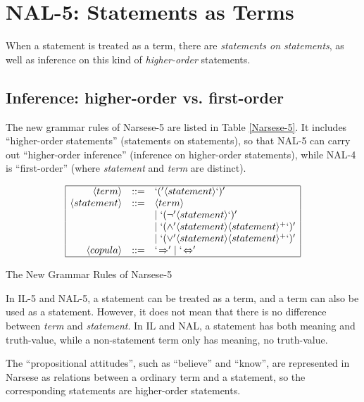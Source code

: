 
\chapter{NAL-5: Statements as Terms}

When a statement is treated as a term, there are \emph{statements on statements}, as well as inference on this kind of \emph{higher-order} statements. 

\section{Inference: higher-order vs. first-order}

The new grammar rules of Narsese-5 are listed in Table \ref{Narsese-5}. It includes ``higher-order statements'' (statements on statements), so that NAL-5 can carry out ``higher-order inference'' (inference on higher-order statements), while NAL-4 is ``first-order'' (where \emph{statement} and \emph{term} are distinct).

\begin{table}[htb]
\[\begin{array}{|rrl|}
\hline
\langle term \rangle & ::= & `(' \langle statement \rangle `)' \\
\langle statement \rangle & ::= & \langle term \rangle \\ &&
                  		 | \; `(\neg' \langle statement \rangle `)'\\ &&
                  		 | \; `(\wedge' \langle statement \rangle \langle statement \rangle^+ `)' \\ &&
                  		 | \; `(\vee' \langle statement \rangle \langle statement \rangle^+ `)' \\
\langle copula \rangle & ::= & `\!\Rightarrow' | \; `\!\Leftrightarrow' \\
\hline
\end{array} \]
\caption{The New Grammar Rules of Narsese-5}
\label{Narsese-5}
\end{table}

In IL-5 and NAL-5, a statement can be treated as a term, and a term can also be used as a statement.  However, it does not mean that there is no difference between \emph{term} and \emph{statement}. In IL and NAL, a statement has both meaning and truth-value, while a non-statement term only has meaning, no truth-value.

The ``propositional attitudes'', such as ``believe'' and ``know'', are represented in Narsese as relations between a ordinary term and a statement, so the corresponding statements are higher-order statements.

